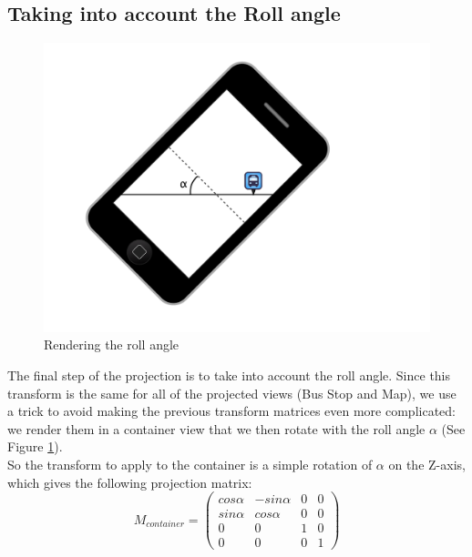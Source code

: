 \subsection{Taking into account the Roll angle}

\begin{figure}[ht]
\center
\includegraphics[scale=0.3]{pics/view_point_alpha}
\caption{Rendering the roll angle}
\label{fig:view_point_alpha}
\end{figure}

The final step of the projection is to take into account the roll angle. Since this transform is the same for all of the projected views (Bus Stop and Map), we use a trick to avoid making the previous transform matrices even more complicated: we render them in a container view that we then rotate with the roll angle $\alpha$ (See Figure \ref{fig:view_point_alpha}).\\

So the transform to apply to the container is a simple rotation of $\alpha$ on the Z-axis, which gives the following projection matrix:
\begin{equation}
 M_{container} = \left( \begin{array}{cccc}
	cos \alpha				& -sin \alpha 			& 0 						& 0\\
	sin \alpha 				& cos \alpha			& 0 						& 0\\
	0					& 0					& 1						& 0\\
	0					& 0					& 0						& 1
\end{array} \right)
\end{equation}


